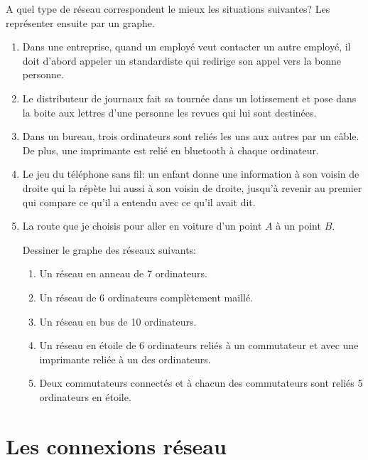 \documentclass[11pt, a4paper]{book}
\begin{document}
\begin{exercice}
A quel type de réseau correspondent le mieux les situations suivantes? Les représenter ensuite par un graphe.
\begin{enumerate}
\item Dans une entreprise, quand un employé veut contacter un autre employé, il doit d'abord appeler un standardiste qui redirige son appel vers la bonne personne.
\item Le distributeur de journaux fait sa tournée dans un lotissement et pose dans la boite aux lettres d'une personne les revues qui lui sont destinées. 
\item Dans un bureau, trois ordinateurs sont reliés les uns aux autres par un câble. De plus, une imprimante est relié en bluetooth à chaque ordinateur.
\item Le jeu du téléphone sans fil: un enfant donne une information à son voisin de droite qui la répète  lui aussi à son voisin de droite, jusqu'à revenir au premier qui compare ce qu'il a entendu avec ce qu'il avait dit.
\item La route que je choisis pour aller en voiture d'un point $A$ à un point $B$.

\begin{exercice}
Dessiner le graphe des réseaux suivants:
\begin{enumerate}
\item Un réseau en anneau de 7 ordinateurs.
\item Un réseau de 6 ordinateurs complètement maillé.
\item Un réseau en bus de 10 ordinateurs.
\item Un réseau en étoile de 6 ordinateurs reliés à un commutateur et avec une imprimante reliée à un des ordinateurs.
\item Deux commutateurs connectés et à chacun des commutateurs sont reliés 5 ordinateurs en étoile. 

\end{enumerate}
\end{exercice}

\end{enumerate}


\end{exercice}


\section{Les connexions réseau}
\end{document}
